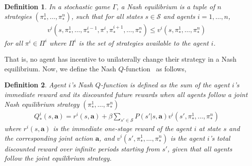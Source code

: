 \documentclass[jair, twoside,11pt,theapa]{article}
\newtheorem{defn}{Definition}
\begin{document}
 
 \begin{defn}\label{defn:nasheqstochasticgame}
     In a stochastic game $\Gamma$, a Nash equilibrium is a tuple of $n$ strategies $(\pi^1_{*}, \ldots, \pi^n_{*})$, such that for all states $s \in \mathcal{S}$ and agents $i = 1,\ldots, n$,
      \begin{equation}
    \begin{array}{l}
         v^i(s, \pi^1_{*}, \ldots, \pi^{i-1}_{*}, \pi^i, \pi_{*}^{i+1}, \ldots, \pi_{*}^n)  \leq v^i(s, \pi^1_{*}, \ldots, \pi^n_{*})
    \end{array}{}
\end{equation}
for all $\pi^i \in \Pi^i$ where $\Pi^i$ is the set of strategies available to the agent $i$. 

\end{defn}
 
\noindent That is, no agent has incentive to unilaterally change their strategy in a Nash equilibrium.
Now, we define the Nash $Q$-function~\citep{hu2003nash} as follows,

 
 \begin{defn}
     Agent $i$'s Nash $Q$-function is defined as the sum of the agent $i$'s immediate reward and its discounted future rewards when all agents follow a joint Nash equilibrium strategy $(\pi^1_{*}, \ldots, \pi^n_{*})$ 
     \begin{equation}
     \begin{array}{l}
    Q^i_{*}(s, \boldsymbol{a}) = r^i(s, \boldsymbol{a})  +   \beta \sum_{s' \in \mathcal{S}} P(s'| s, \boldsymbol{a}) v^i(s', \pi^1_{*}, \ldots, \pi^n_{*})
        \end{array}
\end{equation}
where $r^i(s, \boldsymbol{a})$ is the immediate one-stage reward of the agent $i$ at state $s$ and the corresponding joint action $\boldsymbol{a}$, and $v^i(s', \pi^1_*, \ldots, \pi^n_*)$ is the agent $i$'s total discounted reward over infinite periods starting from $s'$, given that all agents follow the joint equilibrium strategy. 

 \end{defn}
 
\end{document}
